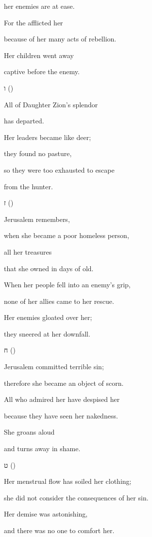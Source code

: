 {\par }{\Q her enemies are at ease.
\par }{\Q For the
{} afflicted her
\par }{\Q because of her many acts of rebellion.
\par }{\Q Her children went away
\par }{\Q captive before the enemy.
\par }{\SH ו ({})
\par }{\Q {}All of Daughter Zion’s splendor
\par }{\Q has departed.
\par }{\Q Her leaders became like deer;
\par }{\Q they found no pasture,
\par }{\Q so they were too exhausted to escape
\par }{\Q from the hunter.
\par }{\SH ז ({})
\par }{\Q {}Jerusalem remembers,
\par }{\Q when she became a poor homeless person,
\par }{\Q all her treasures
\par }{\Q that she owned in days of old.
\par }{\Q When her people fell into an enemy’s grip,
\par }{\Q none of her allies came to her rescue.
\par }{\Q Her enemies gloated over her;
\par }{\Q they sneered at her downfall.
\par }{\SH ח ({})
\par }{\Q {}Jerusalem committed terrible sin;
\par }{\Q therefore she became an object of scorn.
\par }{\Q All who admired her have despised her
\par }{\Q because they have seen her nakedness.
\par }{\Q She groans aloud
\par }{\Q and turns away in shame.
\par }{\SH ט ({})
\par }{\Q {}Her menstrual flow has soiled her clothing;
\par }{\Q she did not consider the consequences of her sin.
\par }{\Q Her demise was astonishing,
\par }{\Q and there was no one to comfort her.
}
